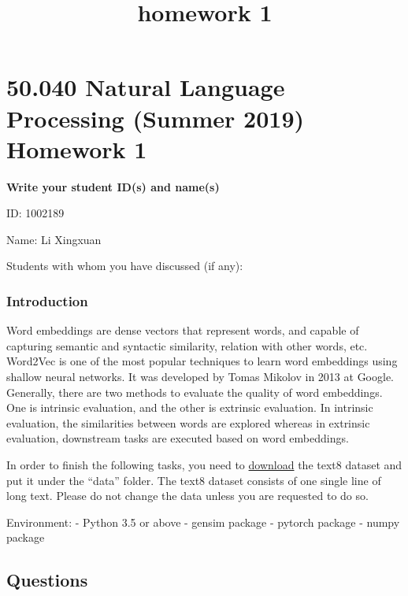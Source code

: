 \documentclass[11pt]{article}
\title{homework 1}
\begin{document}
    
    
    \maketitle
    
    

    
    \hypertarget{natural-language-processing-summer-2019-homework-1}{%
\section{50.040 Natural Language Processing (Summer 2019) Homework
1}\label{natural-language-processing-summer-2019-homework-1}}

    \textbf{Write your student ID(s) and name(s)}

ID: 1002189

Name: Li Xingxuan

Students with whom you have discussed (if any):

    \hypertarget{introduction}{%
\subsubsection{Introduction}\label{introduction}}

Word embeddings are dense vectors that represent words, and capable of
capturing semantic and syntactic similarity, relation with other words,
etc. Word2Vec is one of the most popular techniques to learn word
embeddings using shallow neural networks. It was developed by Tomas
Mikolov in 2013 at Google. Generally, there are two methods to evaluate
the quality of word embeddings. One is intrinsic evaluation, and the
other is extrinsic evaluation. In intrinsic evaluation, the similarities
between words are explored whereas in extrinsic evaluation, downstream
tasks are executed based on word embeddings.

In order to finish the following tasks, you need to
\href{http://mattmahoney.net/dc/text8.zip}{download} the text8 dataset
and put it under the ``data'' folder. The text8 dataset consists of one
single line of long text. Please do not change the data unless you are
requested to do so.

Environment: - Python 3.5 or above - gensim package - pytorch package -
numpy package

    \hypertarget{questions}{%
\subsection{Questions}\label{questions}}
\end{document}
